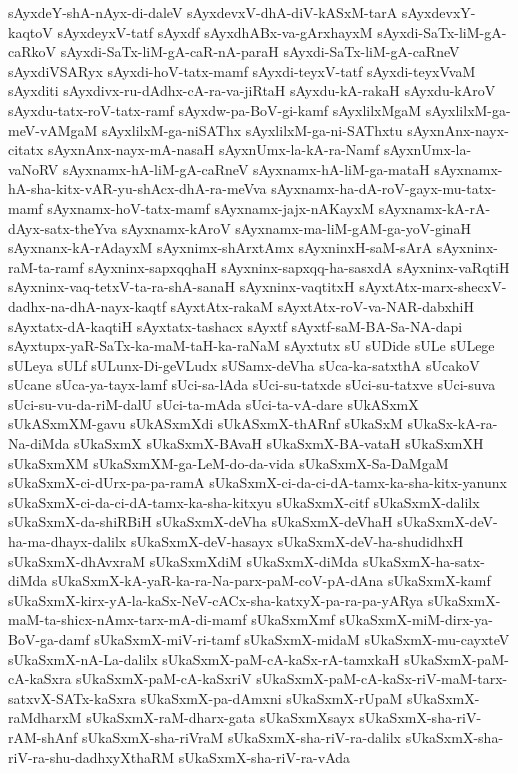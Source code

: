 {sAyxdeY-shA-nAyx-di-daleV
sAyxdevxV-dhA-diV-kASxM-tarA
sAyxdevxY-kaqtoV
sAyxdeyxV-tatf
sAyxdf
sAyxdhABx-va-gArxhayxM
sAyxdi-SaTx-liM-gA-caRkoV
sAyxdi-SaTx-liM-gA-caR-nA-paraH
sAyxdi-SaTx-liM-gA-caRneV
sAyxdiVSARyx
sAyxdi-hoV-tatx-mamf
sAyxdi-teyxV-tatf
sAyxdi-teyxVvaM
sAyxditi
sAyxdivx-ru-dAdhx-cA-ra-va-jiRtaH
sAyxdu-kA-rakaH
sAyxdu-kAroV
sAyxdu-tatx-roV-tatx-ramf
sAyxdw-pa-BoV-gi-kamf
sAyxlilxMgaM
sAyxlilxM-ga-meV-vAMgaM
sAyxlilxM-ga-niSAThx
sAyxlilxM-ga-ni-SAThxtu
sAyxnAnx-nayx-citatx
sAyxnAnx-nayx-mA-nasaH
sAyxnUmx-la-kA-ra-Namf
sAyxnUmx-la-vaNoRV
sAyxnamx-hA-liM-gA-caRneV
sAyxnamx-hA-liM-ga-mataH
sAyxnamx-hA-sha-kitx-vAR-yu-shAcx-dhA-ra-meVva
sAyxnamx-ha-dA-roV-gayx-mu-tatx-mamf
sAyxnamx-hoV-tatx-mamf
sAyxnamx-jajx-nAKayxM
sAyxnamx-kA-rA-dAyx-satx-theYva
sAyxnamx-kAroV
sAyxnamx-ma-liM-gAM-ga-yoV-ginaH
sAyxnanx-kA-rAdayxM
sAyxnimx-shArxtAmx
sAyxninxH-saM-sArA
sAyxninx-raM-ta-ramf
sAyxninx-sapxqqhaH
sAyxninx-sapxqq-ha-sasxdA
sAyxninx-vaRqtiH
sAyxninx-vaq-tetxV-ta-ra-shA-sanaH
sAyxninx-vaqtitxH
sAyxtAtx-marx-shecxV-dadhx-na-dhA-nayx-kaqtf
sAyxtAtx-rakaM
sAyxtAtx-roV-va-NAR-dabxhiH
sAyxtatx-dA-kaqtiH
sAyxtatx-tashacx
sAyxtf
sAyxtf-saM-BA-Sa-NA-dapi
sAyxtupx-yaR-SaTx-ka-maM-taH-ka-raNaM
sAyxtutx
sU
sUDide
sULe
sULege
sULeya
sULf
sULunx-Di-geVLudx
sUSamx-deVha
sUca-ka-satxthA
sUcakoV
sUcane
sUca-ya-tayx-lamf
sUci-sa-lAda
sUci-su-tatxde
sUci-su-tatxve
sUci-suva
sUci-su-vu-da-riM-dalU
sUci-ta-mAda
sUci-ta-vA-dare
sUkASxmX
sUkASxmXM-gavu
sUkASxmXdi
sUkASxmX-thARnf
sUkaSxM
sUkaSx-kA-ra-Na-diMda
sUkaSxmX
sUkaSxmX-BAvaH
sUkaSxmX-BA-vataH
sUkaSxmXH
sUkaSxmXM
sUkaSxmXM-ga-LeM-do-da-vida
sUkaSxmX-Sa-DaMgaM
sUkaSxmX-ci-dUrx-pa-pa-ramA
sUkaSxmX-ci-da-ci-dA-tamx-ka-sha-kitx-yanunx
sUkaSxmX-ci-da-ci-dA-tamx-ka-sha-kitxyu
sUkaSxmX-citf
sUkaSxmX-dalilx
sUkaSxmX-da-shiRBiH
sUkaSxmX-deVha
sUkaSxmX-deVhaH
sUkaSxmX-deV-ha-ma-dhayx-dalilx
sUkaSxmX-deV-hasayx
sUkaSxmX-deV-ha-shudidhxH
sUkaSxmX-dhAvxraM
sUkaSxmXdiM
sUkaSxmX-diMda
sUkaSxmX-ha-satx-diMda
sUkaSxmX-kA-yaR-ka-ra-Na-parx-paM-coV-pA-dAna
sUkaSxmX-kamf
sUkaSxmX-kirx-yA-la-kaSx-NeV-cACx-sha-katxyX-pa-ra-pa-yARya
sUkaSxmX-maM-ta-shicx-nAmx-tarx-mA-di-mamf
sUkaSxmXmf
sUkaSxmX-miM-dirx-ya-BoV-ga-damf
sUkaSxmX-miV-ri-tamf
sUkaSxmX-midaM
sUkaSxmX-mu-cayxteV
sUkaSxmX-nA-La-dalilx
sUkaSxmX-paM-cA-kaSx-rA-tamxkaH
sUkaSxmX-paM-cA-kaSxra
sUkaSxmX-paM-cA-kaSxriV
sUkaSxmX-paM-cA-kaSx-riV-maM-tarx-satxvX-SATx-kaSxra
sUkaSxmX-pa-dAmxni
sUkaSxmX-rUpaM
sUkaSxmX-raMdharxM
sUkaSxmX-raM-dharx-gata
sUkaSxmXsayx
sUkaSxmX-sha-riV-rAM-shAnf
sUkaSxmX-sha-riVraM
sUkaSxmX-sha-riV-ra-dalilx
sUkaSxmX-sha-riV-ra-shu-dadhxyXthaRM
sUkaSxmX-sha-riV-ra-vAda
}
